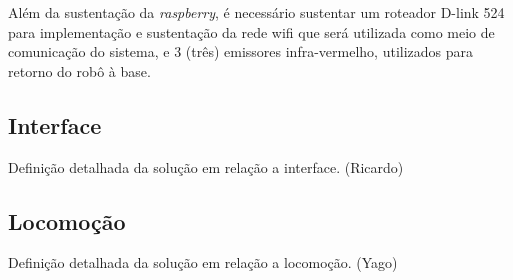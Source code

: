 	Além da sustentação da \textit{raspberry}, é necessário sustentar um roteador D-link 524 para implementação e sustentação da rede wifi que será utilizada como meio de comunicação do sistema, e 3 (três) emissores infra-vermelho, utilizados para retorno do robô à base.
	

\subsection{Interface} %
\label{sub:interface}
	Definição detalhada da solução em relação a interface. (Ricardo)

\subsection{Locomoção} %
\label{sub:locomoção}
	Definição detalhada da solução em relação a locomoção. (Yago)
